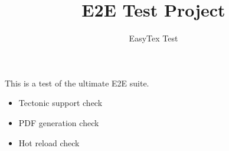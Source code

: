 \documentclass{article}
\title{E2E Test Project}
\author{EasyTex Test}
\begin{document}
\maketitle
This is a test of the ultimate E2E suite.
\begin{itemize}
  \item Tectonic support check
  \item PDF generation check
  \item Hot reload check
\end{itemize}
\end{document}
